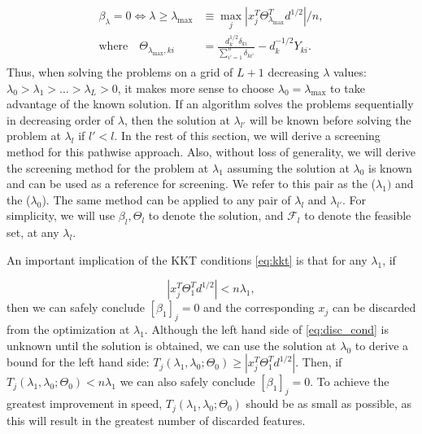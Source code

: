 \begin{gather}
    \label{eq:lammax}
    \begin{aligned}
        \beta_\lambda=0\iff \lambda \geq \lambda_{\max}&\equiv \max_j \left|x_j^T\Theta^T_{\lambda_{\max}}d^{1/2}\right|/n,\\
        \textrm{where}\quad\Theta_{\lambda_{\max},ki}&=\frac{d_k^{1/2}\delta_{ki}}{\sum_{i'=1}^n\delta_{ki'}}-d_k^{-1/2}Y_{ki}.
    \end{aligned}
\end{gather}
Thus, when solving the problems on a grid of $L+1$ decreasing $\lambda$ values: $\lambda_0>\lambda_1>...>\lambda_L>0$, it makes more sense to choose $\lambda_0=\lambda_{\max}$ to take advantage of the known solution. If an algorithm solves the problems sequentially in decreasing order of $\lambda$, then the solution at $\lambda_{l'}$ will be known before solving the problem at $\lambda_l$ if $l'<l$. In the rest of this section, we will derive a screening method for this pathwise approach. Also, without loss of generality, we will derive the screening method for the problem at $\lambda_1$ assuming the solution at $\lambda_0$ is known and can be used as a reference for screening. We refer to this pair as the  ($\lambda_1)$ and the  ($\lambda_0$). The same method can be applied to any pair of $\lambda_{l}$ and $\lambda_{l'}$. For simplicity, we will use $\beta_l,\Theta_l$ to denote the solution, and $\mathcal{F}_l$ to denote the feasible set, at any $\lambda_l$.

An important implication of the KKT conditions \eqref{eq:kkt} is that for any $\lambda_1$, if 

\begin{equation}
    \label{eq:disc_cond}
    |x_j^T\Theta_{1}^Td^{1/2}|<n\lambda_1,
\end{equation}
then we can safely conclude $[\beta_1]_{j}=0$ and the corresponding $x_j$ can be discarded from the optimization at $\lambda_1$. Although the left hand side of \eqref{eq:disc_cond} is unknown until the solution is obtained, we can use the solution at $\lambda_{0}$ to derive a bound for the left hand side: $T_j(\lambda_{1},\lambda_{0};\Theta_{0})\geq |x_j^T\Theta_{1}^Td^{1/2}|$. Then, if $T_j(\lambda_{1},\lambda_{0};\Theta_{0})<n\lambda_1$ we can also safely conclude $[\beta_1]_{j}=0$. To achieve the greatest improvement in speed, $T_j(\lambda_{1},\lambda_{0};\Theta_{0})$ should be as small as possible, as this will result in the greatest number of discarded features.

